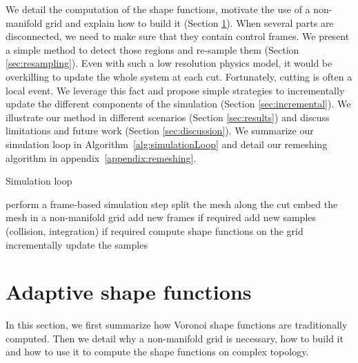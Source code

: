 We detail the computation of the shape functions, motivate the use of a non-manifold grid and explain how to build it (Section \ref{sec:adaptivesf}). When several parts are disconnected, we need to make sure that they contain control frames. We present a simple method to detect those regions and re-sample them (Section \ref{sec:resampling}). Even with such a low resolution physics model, it would be overkilling to update the whole system at each cut. Fortunately, cutting is often a local event. We leverage this fact and propose simple strategies to incrementally update the different components of the simulation (Section \ref{sec:incremental}). We illustrate our method in different scenarios (Section \ref{sec:results}) and discuss limitations and future work (Section \ref{sec:discussion}). We summarize our simulation loop in Algorithm~\ref{alg:simulationLoop} and detail our remeshing algorithm in appendix~\ref{appendix:remeshing}.

\begin{algorithm}[!h]
\caption[Frame-based cutting: Simulation loop]{\label{alg:simulationLoop}Simulation loop}
\begin{algorithmic}[0]
	\State perform a frame-based simulation step
	\State split the mesh along the cut
	\State embed the mesh in a non-manifold grid
	\State add new frames if required
	\State add new samples (collision, integration) if required
	\State compute shape functions on the grid
	\State incrementally update the samples
\EndFor
\end{algorithmic}
\end{algorithm}

\section{Adaptive shape functions} \label{sec:adaptivesf}

In this section, we first summarize how Voronoi shape functions are traditionally computed. Then we detail why a non-manifold grid is necessary, how to build it and how to use it to compute the shape functions on complex topology.


